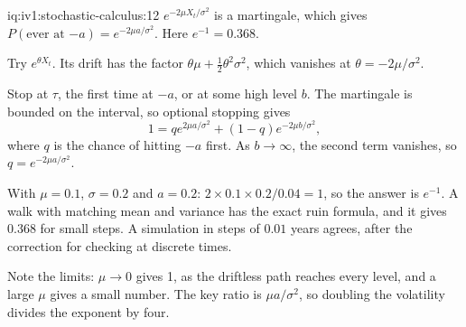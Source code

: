 \begin{solution}{iq:iv1:stochastic-calculus:12}
$e^{-2\mu X_t/\sigma^2}$ is a martingale, which gives $P(\text{ever at } {-a}) = e^{-2\mu a/\sigma^2}$. Here $e^{-1} = 0.368$.

Try $e^{\theta X_t}$. Its drift has the factor $\theta\mu + \frac12\theta^2\sigma^2$, which vanishes at $\theta = -2\mu/\sigma^2$.

Stop at $\tau$, the first time at $-a$, or at some high level $b$. The martingale is bounded on the interval, so optional stopping gives
\[
1 = qe^{2\mu a/\sigma^2} + (1 - q)e^{-2\mu b/\sigma^2},
\]
where $q$ is the chance of hitting $-a$ first. As $b \to \infty$, the second term vanishes, so $q = e^{-2\mu a/\sigma^2}$.

With $\mu = 0.1$, $\sigma = 0.2$ and $a = 0.2$: $2 \times 0.1 \times 0.2/0.04 = 1$, so the answer is $e^{-1}$. A walk with matching mean and variance has the exact ruin formula, and it gives $0.368$ for small steps. A simulation in steps of $0.01$ years agrees, after the correction for checking at discrete times.

Note the limits: $\mu \to 0$ gives 1, as the driftless path reaches every level, and a large $\mu$ gives a small number. The key ratio is $\mu a/\sigma^2$, so doubling the volatility divides the exponent by four.



\end{solution}

